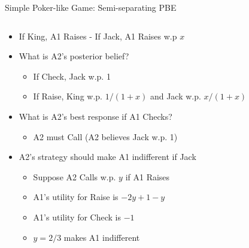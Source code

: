 \documentclass[11pt,aspectratio=169,handout]{beamer}
\begin{document}
  
  \begin{frame}{Simple Poker-like Game: Semi-separating PBE}
   \begin{columns}
    \begin{column}{0.6\textwidth}
     \begin{itemize}[<+->] \scriptsize
      \item If King, A1 Raises - If Jack, A1 Raises w.p $x$
      \item What is A2's posterior belief?
      \begin{itemize}\scriptsize
       \item If Check, Jack w.p. 1
       \item If Raise, King w.p. $1/(1+x)$ and Jack w.p. $x/(1+x)$
      \end{itemize}
      \item What is A2's best response if A1 Checks?
      \begin{itemize}\scriptsize
       \item A2 must Call (A2 believes Jack w.p. 1)
      \end{itemize}
      \item A2's strategy should make A1 indifferent if Jack
      \begin{itemize}\scriptsize
       \item Suppose A2 Calls w.p. $y$ if A1 Raises
       \item A1's utility for Raise is $-2y+1-y$
       \item A1's utility for Check is $-1$
       \item $y = 2/3$ makes A1 indifferent
      \end{itemize}
     \end{itemize}
    \end{column}
    \begin{column}{0.4\textwidth}   
     \begin{center}
\end{center}
\end{column}
\end{columns}
\end{frame}
\end{document}
